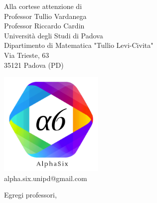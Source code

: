 \documentclass[12pt]{letter} %
\begin{document}


	\begin{letter}{%
		Alla cortese attenzione di
		\\Professor Tullio Vardanega
		\\Professor Riccardo Cardin
		\vspace{0.7em}
		\\Università degli Studi di Padova
		\\Dipartimento di Matematica "Tullio Levi-Civita"
		\\Via Trieste, 63
		\\35121 Padova (PD)
	} %

	\begin{center}
		\includegraphics[width=5cm]{../template/icons/a6.png}
		\\ alpha.six.unipd@gmail.com
	\end{center}

	\opening{%
		Egregi professori,
	}


\end{letter}
\end{document}
